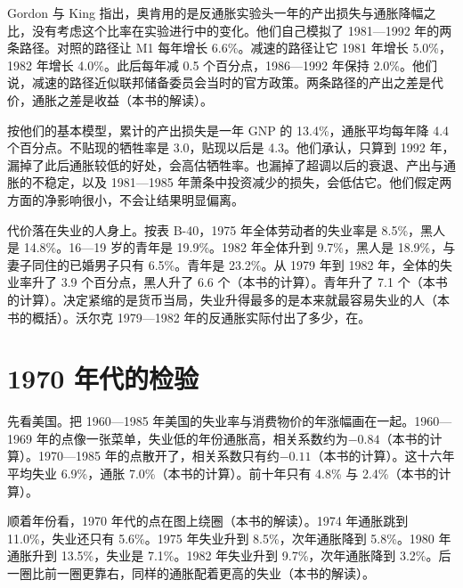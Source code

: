 Gordon 与 King 指出，奥肯用的是反通胀实验头一年的产出损失与通胀降幅之比，没有考虑这个比率在实验进行中的变化\cite{gordon1982}。他们自己模拟了 1981—1992 年的两条路径\cite{gordon1982}。对照的路径让 M1 每年增长 6.6\%\cite{gordon1982}。减速的路径让它 1981 年增长 5.0\%，1982 年增长 4.0\%\cite{gordon1982}。此后每年减 0.5 个百分点，1986—1992 年保持 2.0\%\cite{gordon1982}。他们说，减速的路径近似联邦储备委员会当时的官方政策\cite{gordon1982}。两条路径的产出之差是代价，通胀之差是收益（本书的解读）。

按他们的基本模型，累计的产出损失是一年 GNP 的 13.4\%，通胀平均每年降 4.4 个百分点\cite{gordon1982}。不贴现的牺牲率是 3.0，贴现以后是 4.3\cite{gordon1982}。他们承认，只算到 1992 年，漏掉了此后通胀较低的好处，会高估牺牲率\cite{gordon1982}。也漏掉了超调以后的衰退、产出与通胀的不稳定，以及 1981—1985 年萧条中投资减少的损失，会低估它\cite{gordon1982}。他们假定两方面的净影响很小，不会让结果明显偏离\cite{gordon1982}。

代价落在失业的人身上。按表 B-40，1975 年全体劳动者的失业率是 8.5\%，黑人是 14.8\%\cite{erp2000}。16—19 岁的青年是 19.9\%\cite{erp2000}。1982 年全体升到 9.7\%，黑人是 18.9\%，与妻子同住的已婚男子只有 6.5\%\cite{erp2000}。青年是 23.2\%\cite{erp2000}。从 1979 年到 1982 年，全体的失业率升了 3.9 个百分点，黑人升了 6.6 个（本书的计算）。青年升了 7.1 个（本书的计算）。决定紧缩的是货币当局，失业升得最多的是本来就最容易失业的人（本书的概括）。沃尔克 1979—1982 年的反通胀实际付出了多少，在。

\section{1970 年代的检验}\label{sec:naturalrate-test}

先看美国。把 1960—1985 年美国的失业率与消费物价的年涨幅画在一起\cite{erp2000}。1960—1969 年的点像一张菜单，失业低的年份通胀高，相关系数约为$-0.84$（本书的计算）。1970—1985 年的点散开了，相关系数只有约$-0.11$（本书的计算）。这十六年平均失业 6.9\%，通胀 7.0\%（本书的计算）。前十年只有 4.8\% 与 2.4\%（本书的计算）。

顺着年份看，1970 年代的点在图上绕圈（本书的解读）。1974 年通胀跳到 11.0\%，失业还只有 5.6\%\cite{erp2000}。1975 年失业升到 8.5\%，次年通胀降到 5.8\%\cite{erp2000}。1980 年通胀升到 13.5\%，失业是 7.1\%\cite{erp2000}。1982 年失业升到 9.7\%，次年通胀降到 3.2\%\cite{erp2000}。后一圈比前一圈更靠右，同样的通胀配着更高的失业（本书的解读）。

